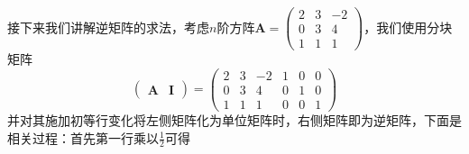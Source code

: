 接下来我们讲解逆矩阵的求法，考虑$n$阶方阵$\mathbf{A}=\begin{pmatrix}
	2 & 3 & -2\\
	0 & 3 & 4\\
	1 & 1 & 1
\end{pmatrix}$，我们使用分块矩阵 $$\left( \begin{array}{c|c}
	\mathbf{A} & \mathbf{I}
\end{array} \right)=\left( \begin{array}{ccc|ccc}
	2 & 3 & -2 & 1 & 0 & 0\\
	0 & 3 & 4 & 0 & 1 & 0\\
	1 & 1 & 1 & 0 & 0 & 1
\end{array} \right)$$并对其施加初等行变化将左侧矩阵化为单位矩阵时，右侧矩阵即为逆矩阵，下面是相关过程：首先第一行乘以$\displaystyle \frac{1}{2}$可得
